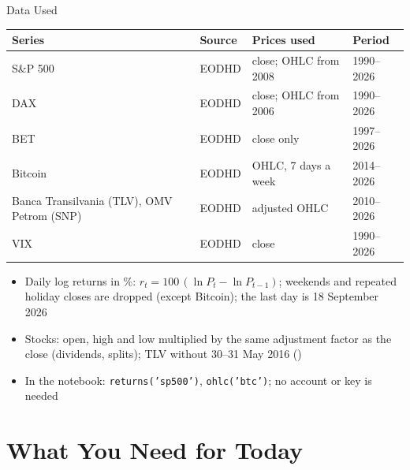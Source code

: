 \begin{frame}{Data Used}
\itemsize{\small}
\begin{center}
\footnotesize
\begin{tabular}{llll}
\toprule
\textbf{Series} & \textbf{Source} & \textbf{Prices used} & \textbf{Period} \\
\midrule
S\&P 500 & EODHD & close; OHLC from 2008 & 1990--2026 \\
DAX & EODHD & close; OHLC from 2006 & 1990--2026 \\
BET & EODHD & close only & 1997--2026 \\
Bitcoin & EODHD & OHLC, 7 days a week & 2014--2026 \\
Banca Transilvania (TLV), OMV Petrom (SNP) & EODHD & adjusted OHLC & 2010--2026 \\
VIX & EODHD & close & 1990--2026 \\
\bottomrule
\end{tabular}
\end{center}
\begin{itemize}
    \item Daily log returns in \%: $r_t = 100\,(\ln P_t - \ln P_{t-1})$; weekends and repeated holiday closes are dropped (except Bitcoin); the last day is 18 September 2026
    \item Stocks: open, high and low multiplied by the same adjustment factor as the close (dividends, splits); TLV without 30--31 May 2016 ()
    \item In the notebook: \texttt{returns('sp500')}, \texttt{ohlc('btc')}; no account or key is needed
\end{itemize}
\end{frame}


\section{What You Need for Today}

